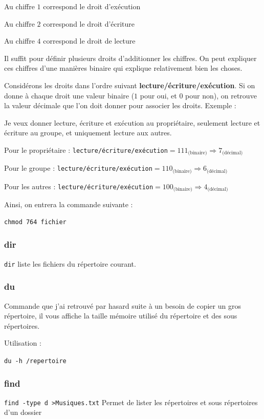 \documentclass[a4paper,twoside]{article}
\begin{document}
Au chiffre $1$ correspond le droit d'exécution

Au chiffre $2$ correspond le droit d'écriture

Au chiffre $4$ correspond le droit de lecture

Il suffit pour définir plusieurs droits d'additionner les chiffres. On peut expliquer ces chiffres d'une manières binaire qui explique relativement bien les choses.

Considérons les droits dans l'ordre suivant \textbf{lecture/écriture/exécution}. Si on donne à chaque droit une valeur binaire ($1$ pour oui, et $0$ pour non), on retrouve la valeur décimale que l'on doit donner pour associer les droits. Exemple :

Je veux donner lecture, écriture et exécution au propriétaire, seulement lecture et écriture au groupe, et uniquement lecture aux autres.

Pour le propriétaire : \texttt{lecture/écriture/exécution}$=111_{\text{(binaire)}}\Rightarrow 7_{\text{(décimal)}}$

Pour le groupe : \texttt{lecture/écriture/exécution}$=110_{\text{(binaire)}}\Rightarrow 6_{\text{(décimal)}}$

Pour les autres : \texttt{lecture/écriture/exécution}$=100_{\text{(binaire)}}\Rightarrow 4_{\text{(décimal)}}$


Ainsi, on entrera la commande suivante :

\begin{verbatim}
chmod 764 fichier
\end{verbatim}

\subsubsection{dir}
\verb|dir| liste les fichiers du répertoire courant.

\subsubsection{du}
Commande que j'ai retrouvé par hasard suite à un besoin de copier un gros répertoire, il vous affiche la taille mémoire utilisé du répertoire et des sous répertoires.

Utilisation :

\verb|du -h /repertoire|

\subsubsection{find}
\verb|find -type d >Musiques.txt|
Permet de lister les répertoires et sous répertoires d'un dossier
\end{document}
